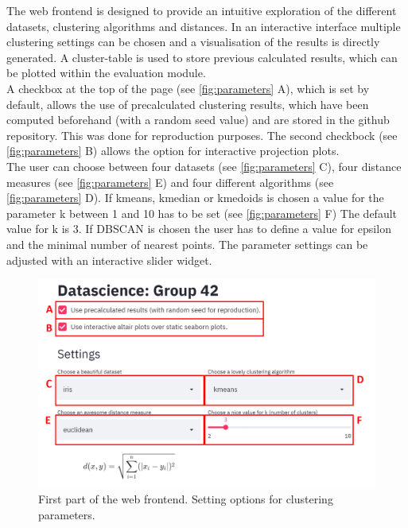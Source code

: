 The web frontend is designed to provide an intuitive exploration of the different datasets, clustering algorithms and distances. In an interactive interface multiple clustering settings can be chosen and a visualisation of the results is directly generated. 
A cluster-table is used to store previous calculated results, which can be plotted within the evaluation module. \\
A checkbox at the top of the page (see \autoref{fig:parameters} A), which is set by default, allows the use of precalculated clustering results, which have been computed beforehand (with a random seed value) and are stored in the github repository. This was done for reproduction purposes. The second checkbock (see \autoref{fig:parameters} B) allows the option for interactive projection plots.  \\
The user can choose between four datasets (see \autoref{fig:parameters} C), four distance measures (see \autoref{fig:parameters} E) and four different algorithms (see \autoref{fig:parameters} D). If kmeans, kmedian or kmedoids is chosen a value for the parameter k between 1 and 10 has to be set (see \autoref{fig:parameters} F) The default value for k is 3. If DBSCAN is chosen the user has to define a value for epsilon and the minimal number of nearest points. The parameter settings can be adjusted with an interactive slider widget. \\
\begin{figure}[H]
	\centering
	\includegraphics[width=\linewidth]{modules/web_frontend/eingabe_letters}
	\caption{First part of the web frontend. Setting options for clustering parameters.}\label{fig:parameters}
\end{figure}

